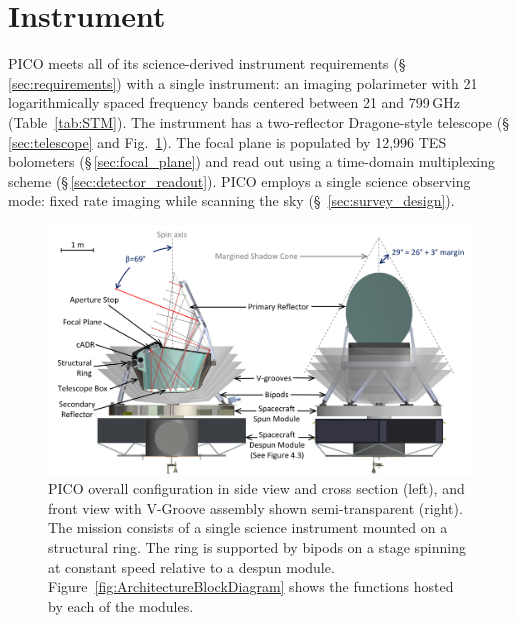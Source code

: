 \newcommand\pdeg{.\!\!\degree}
\newcommand\parcm{.\!\!'}

\section{Instrument}
\label{sec:instrument} %



PICO meets all of its science-derived instrument requirements (\S\,\ref{sec:requirements}) with a single instrument: an imaging polarimeter with 21 logarithmically spaced frequency bands centered between 21 and 799\,GHz (Table~\ref{tab:STM}). The instrument has a two-reflector Dragone-style telescope (\S\,\ref{sec:telescope} and Fig.~\ref{fig:InstrumentCAD}). The focal plane is populated by 12,996 \ac{TES} bolometers (\S\,\ref{sec:focal_plane}) and read out using a time-domain multiplexing scheme (\S\,\ref{sec:detector_readout}). PICO employs a single science observing mode: fixed rate imaging while scanning the sky (\S~\ref{sec:survey_design}). 
\begin{figure}[h] 
\hspace{-0.1in}
\parbox{5.1in}{\centerline{
\includegraphics[width=5.25in]{figures/InstrumentCAD.png} }}
\hspace{0.05in}
\parbox{1.3in}{
\caption{\captiontext
PICO overall configuration in side view and cross section (left), and front view with V-Groove assembly shown semi-transparent (right).  The mission consists of a single science instrument mounted on a structural ring. The ring is supported by bipods on a stage spinning at constant speed relative to a despun module. Figure~\ref{fig:ArchitectureBlockDiagram} shows the functions hosted by each of the modules. 
\label{fig:InstrumentCAD}} }
\vspace{-0.1in}
\end{figure}

